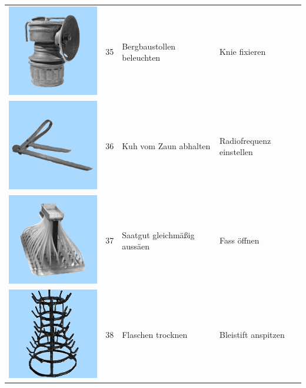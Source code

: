 \documentclass[
  english,
  man,floatsintext]{apa7}
\begin{document}
\begin{center}
\begin{ThreePartTable}
\begin{longtable}{llll}
\includegraphics[valign=c, scale=0.19]{../materials/unfamiliar/35.png} & 35 & Bergbaustollen beleuchten & Knie fixieren\\
\includegraphics[valign=c, scale=0.19]{../materials/unfamiliar/36.png} & 36 & Kuh vom Zaun abhalten & Radiofrequenz einstellen\\
\includegraphics[valign=c, scale=0.19]{../materials/unfamiliar/37.png} & 37 & Saatgut gleichmäßig aussäen & Fass öffnen\\
\includegraphics[valign=c, scale=0.19]{../materials/unfamiliar/38.png} & 38 & Flaschen trocknen & Bleistift anspitzen\\

\end{longtable}
\end{ThreePartTable}
\end{center}
\end{document}
